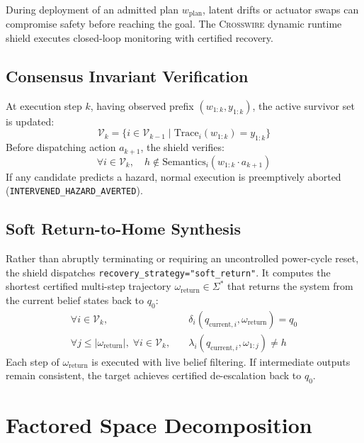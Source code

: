 \documentclass[10pt,twocolumn,letterpaper]{article}
\begin{document}
During deployment of an admitted plan $w_{\text{plan}}$, latent drifts or actuator swaps can compromise safety before reaching the goal. The \textsc{Crosswire} dynamic runtime shield executes closed-loop monitoring with certified recovery.

\subsection{Consensus Invariant Verification}
At execution step $k$, having observed prefix $(w_{1:k}, y_{1:k})$, the active survivor set is updated:
\begin{equation}
    \mathcal{V}_k = \{ i \in \mathcal{V}_{k-1} \mid \text{Trace}_i(w_{1:k}) = y_{1:k} \}
\end{equation}
Before dispatching action $a_{k+1}$, the shield verifies:
\begin{equation}
    \forall i \in \mathcal{V}_k, \quad h \notin \text{Semantics}_i(w_{1:k} \cdot a_{k+1})
\end{equation}
If any candidate predicts a hazard, normal execution is preemptively aborted (\texttt{INTERVENED\_HAZARD\_AVERTED}).

\subsection{Soft Return-to-Home Synthesis}
Rather than abruptly terminating or requiring an uncontrolled power-cycle reset, the shield dispatches \texttt{recovery\_strategy="soft\_return"}. It computes the shortest certified multi-step trajectory $\omega_{\text{return}} \in \Sigma^*$ that returns the system from the current belief states back to $q_0$:
\begin{align}
    \forall i \in \mathcal{V}_k, \quad &\delta_i(q_{\text{current}, i}, \omega_{\text{return}}) = q_0 \\
    \forall j \le |\omega_{\text{return}}|, \; \forall i \in \mathcal{V}_k, \quad &\lambda_i(q_{\text{current}, i}, \omega_{1:j}) \ne h
\end{align}
Each step of $\omega_{\text{return}}$ is executed with live belief filtering. If intermediate outputs remain consistent, the target achieves certified de-escalation back to $q_0$.

\section{Factored Space Decomposition}
\label{sec:factored}
\end{document}
